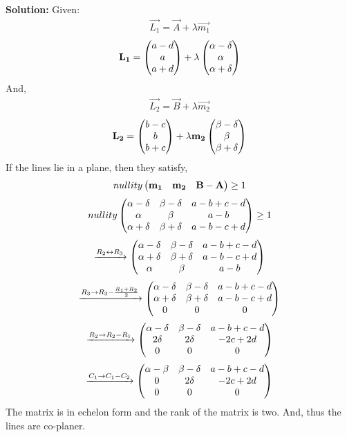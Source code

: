 \documentclass{beamer}
\numberwithin{equation}{section}
\begin{document}
		\textbf{Solution:}
		Given:
		\begin{align}
				\vec{L_1} = \vec{A} + \lambda\vec{m_1}
		\end{align}
		\begin{align}
				\mathbf{L_1} = \begin{pmatrix}a-d \\a\\a+d\end{pmatrix} + \lambda
				\begin{pmatrix}\alpha - \delta\\\alpha\\\alpha + \delta \end{pmatrix}
		\end{align}And,
		\begin{align}
				\vec{L_2} = \vec{B} + \lambda\vec{m_2}
		\end{align}
		\begin{align}
				\mathbf{L_2} = \begin{pmatrix}b-c\\b\\b+c\end{pmatrix} + \lambda\mathbf{m_2}
				\begin{pmatrix}\beta - \delta\\\beta\\\beta + \delta \end{pmatrix}
		\end{align}
		If the lines lie in a plane, then they satisfy,
		\begin{align}
				nullity\begin{pmatrix}\mathbf{m_1}&\mathbf{m_2}&\mathbf{B-A}\end{pmatrix}\geq 1
		\end{align}
		\begin{align}
				nullity\begin{pmatrix}
						\alpha - \delta & \beta -\delta & a-b+c-d \\
						\alpha & \beta & a-b \\
						\alpha + \delta & \beta +\delta & a-b-c+d
				\end{pmatrix}\geq 1
		\end{align}
		\begin{align}
				\xrightarrow[]{R_2\leftrightarrow R_3}\begin{pmatrix}
						\alpha - \delta & \beta -\delta & a-b+c-d \\
						\alpha + \delta & \beta +\delta & a-b-c+d\\
						\alpha & \beta & a-b 
				\end{pmatrix}
		\end{align}
		\begin{align}
				\xrightarrow[]{R_3\rightarrow R_3-\frac{R_1+R_2}{2}}\begin{pmatrix}
						\alpha - \delta & \beta -\delta & a-b+c-d \\
						\alpha + \delta & \beta +\delta & a-b-c+d\\
						0 & 0 & 0 
				\end{pmatrix}
		\end{align}
		\begin{align}
				\xrightarrow[]{R_2\rightarrow R_2-R_1}\begin{pmatrix}
						\alpha - \delta & \beta -\delta & a-b+c-d \\
						2\delta & 2\delta & -2c+2d\\
						0 & 0 & 0 
				\end{pmatrix}
		\end{align}
		\begin{align}
				\xrightarrow[]{C_1\rightarrow C_1-C_2}\begin{pmatrix}
						\alpha - \beta & \beta -\delta & a-b+c-d \\
						0 & 2\delta & -2c+2d\\
						0 & 0 & 0 
				\end{pmatrix}
		\end{align}
		The matrix is in echelon form and the rank of the matrix is two. And, thus the lines are co-planer.
	
\end{document}
